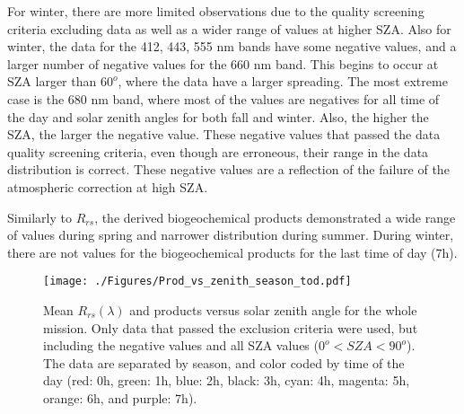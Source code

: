 \documentclass[onecolumn,3p,letterpaper,11pt]{elsarticle}
\begin{document}
For winter, there are more limited observations due to the quality screening criteria excluding data as well as a wider range of values at higher SZA. 
Also for winter, the data for the 412, 443, 555 nm bands have some negative values, and a larger number of negative values for the  660 nm band.
This begins to occur at SZA larger than $60^o$, where the data have a larger spreading. 
The most extreme case is the 680 nm band, where most of the values are negatives for all time of the day and solar zenith angles for both fall and winter. 
Also, the higher the SZA, the larger the negative value.
These negative values that passed the data quality screening criteria, even though are erroneous, their range in the data distribution is correct.
These negative values are a reflection of the failure of the atmospheric correction at high SZA.

Similarly to $R_{rs}$, the derived biogeochemical products demonstrated a wide range of values during spring and narrower distribution during summer.
During winter, there are not values for the biogeochemical products for the last time of day (7h).

\begin{figure}[H]
  \hspace{-0.8cm}
  \texttt{[image: ./Figures/Prod\_vs\_zenith\_season\_tod.pdf]}
  \vspace{-1.3cm}
  \caption{Mean $R_{rs}(\lambda)$ and products versus solar zenith angle for the whole mission. Only data that passed the exclusion criteria were used, but including the negative values and all SZA values ($0^o<SZA<90^o$). The data are separated by season, and color coded by time of the day (red: 0h, green: 1h, blue: 2h, black: 3h, cyan: 4h, magenta: 5h, orange: 6h, and purple: 7h). \label{fig:Prod_vs_zenith_season_tod} } 
\end{figure}

\end{document}
